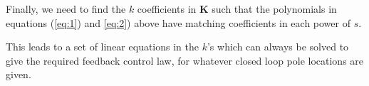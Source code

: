 Finally, we need to find the $k$  coefficients in $\mathbf{K}$ such that the polynomials in equations  (\ref{eq:1})  and  \ref{eq:2}) above have matching coefficients in each power of $s$.

This leads to a set of linear equations in the $k$'s  which can always be solved to give the required feedback control law, for whatever closed loop pole locations are given.

\endinput

